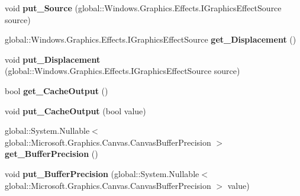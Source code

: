 \begin{DoxyCompactItemize}
void {\bfseries put\+\_\+\+Source} (global\+::\+Windows.\+Graphics.\+Effects.\+I\+Graphics\+Effect\+Source source)
\item 
\mbox{\label{class_microsoft_1_1_graphics_1_1_canvas_1_1_effects_1_1_displacement_map_effect_aaf5364680c98ed0f56450c34b38dd81a}} 
global\+::\+Windows.\+Graphics.\+Effects.\+I\+Graphics\+Effect\+Source {\bfseries get\+\_\+\+Displacement} ()
\item 
\mbox{\label{class_microsoft_1_1_graphics_1_1_canvas_1_1_effects_1_1_displacement_map_effect_ae673a7b19adf4c74fc290965e8c469d3}} 
void {\bfseries put\+\_\+\+Displacement} (global\+::\+Windows.\+Graphics.\+Effects.\+I\+Graphics\+Effect\+Source source)
\item 
\mbox{\label{class_microsoft_1_1_graphics_1_1_canvas_1_1_effects_1_1_displacement_map_effect_a98dc9dff78bcf54a0714684a37fac496}} 
bool {\bfseries get\+\_\+\+Cache\+Output} ()
\item 
\mbox{\label{class_microsoft_1_1_graphics_1_1_canvas_1_1_effects_1_1_displacement_map_effect_a6ea6152dfdb5861dd9ddb378972ab881}} 
void {\bfseries put\+\_\+\+Cache\+Output} (bool value)
\item 
\mbox{\label{class_microsoft_1_1_graphics_1_1_canvas_1_1_effects_1_1_displacement_map_effect_a85345dfa5889a8d0eeaa2c0eef0af1f6}} 
global\+::\+System.\+Nullable$<$ global\+::\+Microsoft.\+Graphics.\+Canvas.\+Canvas\+Buffer\+Precision $>$ {\bfseries get\+\_\+\+Buffer\+Precision} ()
\item 
\mbox{\label{class_microsoft_1_1_graphics_1_1_canvas_1_1_effects_1_1_displacement_map_effect_ad6130a57ecf408ba6f8e0e9e37720c01}} 
void {\bfseries put\+\_\+\+Buffer\+Precision} (global\+::\+System.\+Nullable$<$ global\+::\+Microsoft.\+Graphics.\+Canvas.\+Canvas\+Buffer\+Precision $>$ value)
\item 

\end{DoxyCompactItemize}
